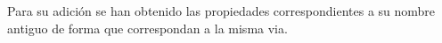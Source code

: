 \begin{itemize}
Para su adición se han obtenido las propiedades correspondientes a su nombre antiguo de forma que correspondan a la misma via.









\end{itemize}





